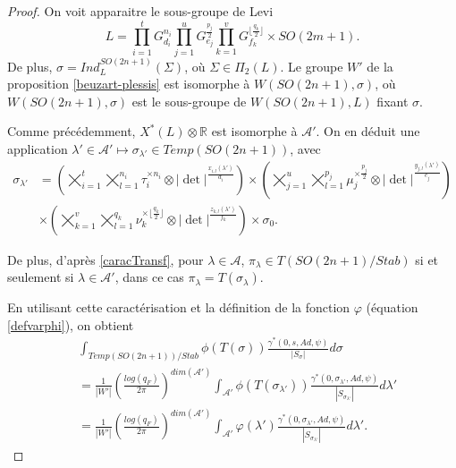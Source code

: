 \documentclass{amsart}
\begin{document}
\begin{proof}
On voit apparaitre le sous-groupe de Levi
\begin{equation}
\label{leviOrtho}
L = \prod_{i=1}^t G_{d_i}^{n_i} \prod_{j=1}^u G_{e_j}^{\frac{p_j}{2}} \prod_{k=1}^v G_{f_k}^{\lfloor \frac{q_k}{2} \rfloor} \times SO(2m+1).
\end{equation}
De plus, $\sigma = Ind_L^{SO(2n+1)}(\Sigma)$, où $\Sigma \in \Pi_2(L)$. Le groupe $W'$ de la proposition \ref{beuzart-plessis} est isomorphe à $W(SO(2n+1), \sigma)$, où $W(SO(2n+1), \sigma)$ est le sous-groupe de $W(SO(2n+1), L)$ fixant $\sigma$.

Comme précédemment, $X^*(L) \otimes \mathbb{R}$ est isomorphe à $\mathcal{A}'$. On en déduit une application $\lambda' \in \mathcal{A}' \mapsto \sigma_{\lambda'} \in Temp(SO(2n+1))$, avec
\begin{equation}
\begin{split}
\sigma_{\lambda'} &= \left( \bigtimes_{i=1}^t \bigtimes_{l=1}^{n_i} \tau_i^{\times n_i} \otimes |\det|^{\frac{x_{i,l}(\lambda')}{d_i}} \right) \times \left( \bigtimes_{j=1}^u \bigtimes_{l=1}^{p_j}\mu_j^{\times \frac{p_j}{2}} \otimes |\det|^{\frac{y_{j,l}(\lambda')}{e_j}} \right) \\
&\times \left(\bigtimes_{k=1}^v \bigtimes_{l=1}^{q_k} \nu_k^{\times \lfloor \frac{q_k}{2} \rfloor} \otimes |\det|^{\frac{z_{k,l}(\lambda')}{f_k}} \right) \times \sigma_0.
\end{split}
\end{equation}

De plus, d'après \ref{caracTransf}, pour $\lambda \in \mathcal{A}$, $\pi_\lambda \in T(SO(2n+1)/Stab)$ si et seulement si $\lambda \in \mathcal{A}'$, dans ce cas $\pi_\lambda = T(\sigma_\lambda)$.

En utilisant cette caractérisation et la définition de la fonction $\varphi$ (équation \ref{defvarphi}), on obtient
\begin{equation}
\label{membreDroite}
\begin{split}
& \int_{Temp(SO(2n+1))/Stab} \phi(T(\sigma)) \frac{\gamma^*(0, s, Ad, \psi)}{|S_\sigma|} d\sigma \\
&= \frac{1}{|W'|} \left(\frac{log(q_F)}{2\pi}\right)^{dim(\mathcal{A}')} \int_{\mathcal{A}'} \phi(T(\sigma_{\lambda'})) \frac{\gamma^*(0, \sigma_{\lambda'}, Ad, \psi)}{|S_{\sigma_{\lambda'}}|} d\lambda' \\
&= \frac{1}{|W'|} \left(\frac{log(q_F)}{2\pi}\right)^{dim(\mathcal{A}')} \int_{\mathcal{A}'} \varphi(\lambda') \frac{\gamma^*(0, \sigma_{\lambda'}, Ad, \psi)}{|S_{\sigma_{\lambda'}}|} d\lambda'.
\end{split}
\end{equation}


\end{proof}
\end{document}
